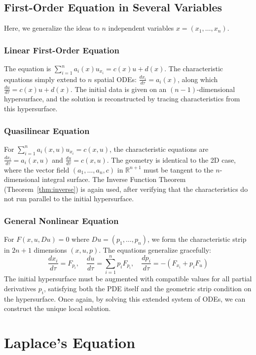 \documentclass[11pt]{article}
\theoremstyle{plain}
\theoremstyle{definition}
\theoremstyle{remark}
\begin{document}
\subsection{First-Order Equation in Several Variables}
Here, we generalize the ideas to $n$ independent variables $x = (x_1, \dots, x_n)$.

\subsubsection{Linear First-Order Equation}
The equation is $\sum_{i=1}^n a_i(x) u_{x_i} = c(x) u + d(x)$. The characteristic equations simply extend to $n$ spatial ODEs: $\frac{dx_i}{d\tau} = a_i(x)$, along which $\frac{du}{d\tau} = c(x)u + d(x)$. The initial data is given on an $(n-1)$-dimensional hypersurface, and the solution is reconstructed by tracing characteristics from this hypersurface.

\subsubsection{Quasilinear Equation}
For $\sum_{i=1}^n a_i(x, u) u_{x_i} = c(x, u)$, the characteristic equations are $\frac{dx_i}{d\tau} = a_i(x,u)$ and $\frac{du}{d\tau} = c(x,u)$. The geometry is identical to the 2D case, where the vector field $(a_1, \dots, a_n, c)$ in $\mathbb{R}^{n+1}$ must be tangent to the $n$-dimensional integral surface. The Inverse Function Theorem (Theorem~\ref{thm:inverse}) is again used, after verifying that the characteristics do not run parallel to the initial hypersurface.

\subsubsection{General Nonlinear Equation}
For $F(x, u, Du) = 0$ where $Du = (p_1, \dots, p_n)$, we form the characteristic strip in $2n+1$ dimensions $(x, u, p)$. 
The equations generalize gracefully:
$$ \frac{dx_i}{d\tau} = F_{p_i}, \quad \frac{du}{d\tau} = \sum_{i=1}^n p_i F_{p_i}, \quad \frac{dp_i}{d\tau} = -(F_{x_i} + p_i F_u) $$
The initial hypersurface must be augmented with compatible values for all partial derivatives $p_i$, satisfying both the PDE itself and the geometric strip condition on the hypersurface. Once again, by solving this extended system of ODEs, we can construct the unique local solution.

\section{Laplace's Equation}\label{sec:laplace}
\end{document}
